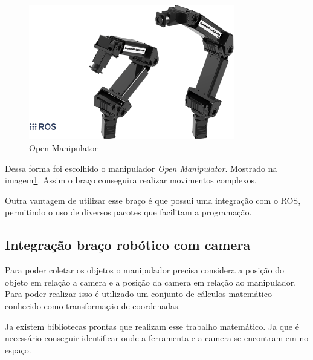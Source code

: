 \documentclass[conference]{IEEEtran}
\begin{document}
\begin{figure}[h!]
    \centering
        \includegraphics[width=9cm]{images/product_img.png}
    \caption{Open Manipulator\cite{OpenMANI65:online}}
    \label{fig:open_m}
\end{figure}

Dessa forma foi escolhido o manipulador \textit{Open Manipulator}. Mostrado na imagem\ref{fig:open_m}. Assim o braço conseguira realizar movimentos complexos.

Outra vantagem de utilizar esse braço é que possui uma integração com o ROS, permitindo o uso de diversos pacotes que facilitam a programação.

\subsection{Integração braço robótico com camera}

Para poder coletar os objetos o manipulador precisa considera a posição do objeto em relação a camera e a posição da camera em relação ao manipulador. Para poder realizar isso é utilizado um conjunto de cálculos matemático conhecido como transformação de coordenadas.

Ja existem bibliotecas prontas que realizam esse trabalho matemático\cite{tfROSWik45:online}. Ja que é necessário conseguir identificar onde a ferramenta e a camera se encontram em no espaço.






\end{document}
